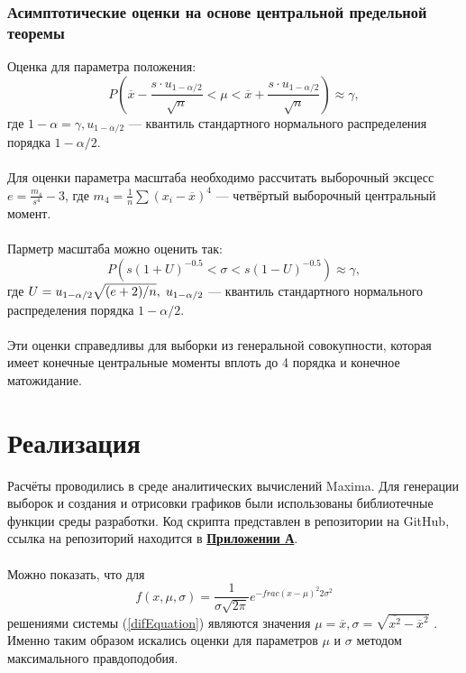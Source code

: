 \documentclass[12pt]{article}
\begin{document}
\subsubsection{Асимптотические оценки на основе центральной предельной теоремы}
Оценка для параметра положения:
\begin{equation}
    P\left(\overline{x}-\frac{s\cdot u_{1-\alpha/2}}{\sqrt{n}} < \mu < \overline{x}+\frac{s\cdot u_{1-\alpha/2}}{\sqrt{n}}\right) \approx \gamma,
    \label{mAsympt}
\end{equation}
где $1-\alpha = \gamma, u_{1-\alpha/2}$ --- квантиль стандартного нормального распределения порядка $1 - \alpha/2$.\\
\phantom{0}\\
Для оценки параметра масштаба необходимо рассчитать выборочный эксцесс $e = \frac{m_4}{s^4}-3$, где $m_4 = \frac{1}{n}\sum(x_i - \overline{x})^4$ --- четвёртый выборочный центральный момент.\\
\phantom{0}\\
Парметр масштаба можно оценить так:
\begin{equation}
    P\left(s(1 + U)^{-0.5} < \sigma < s(1 - U)^{-0.5}\right) \approx \gamma,
    \label{sAsympt}
\end{equation} 
где $U = u_{1-\alpha/2}\sqrt{\mathstrut (e+2)/n}, \; u_{1-\alpha/2}$ --- квантиль стандартного нормального распределения порядка $1 - \alpha/2$.\\
\phantom{0}\\
Эти оценки справедливы для выборки из генеральной совокупности, которая имеет конечные центральные моменты вплоть до 4 порядка и конечное матожидание.

\section{Реализация}
Расчёты проводились в среде аналитических вычислений Maxima. Для генерации выборок и создания и отрисовки графиков были использованы библиотечные функции среды разработки. Код скрипта представлен в репозитории на GitHub, ссылка на репозиторий находится в \hyperlink{addition}{\textbf{Приложении А}}.\\
\phantom{0}\\
Можно показать, что для 
\[
    f(x,\mu,\sigma) = \frac{1}{\sigma\sqrt{2\pi}}e^{-frac{(x-\mu)^2}{2\sigma^2}}    
\]
решениями системы (\ref{difEquation}) являются значения $\mu = \overline{x}, \sigma = \sqrt{\overline{x^2} - \overline{x}^2}$ \cite{site}. Именно таким образом искались оценки для параметров $\mu$ и $\sigma$ методом максимального правдоподобия.
\newpage
\end{document}
